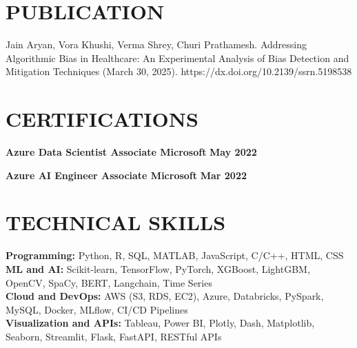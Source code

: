 \documentclass[10pt]{article}
\begin{document}
\vspace{-0.4cm} 
\section*{PUBLICATION} 
\vspace{-0.2cm}

\noindent
\noindent Jain Aryan, Vora Khushi, Verma Shrey, Churi Prathamesh. Addressing Algorithmic Bias in Healthcare: An Experimental Analysis of Bias Detection and Mitigation Techniques (March 30, 2025). https://dx.doi.org/10.2139/ssrn.5198538


\vspace{-0.4cm} 
\section*{CERTIFICATIONS} 
\vspace{-0.2cm}

\noindent
\textbf{Azure Data Scientist Associate \textbar{} Microsoft } \hfill \textbf{May 2022 }

\noindent
\textbf{Azure AI Engineer Associate \textbar{} Microsoft } \hfill \textbf{Mar 2022 }


\vspace{-0.4cm} 
\section*{TECHNICAL SKILLS} 
\vspace{-0.2cm}
\noindent
\textbf{Programming:} Python, R, SQL, MATLAB, JavaScript, C/C++, HTML, CSS \\
\textbf{ML and AI:} Scikit-learn, TensorFlow, PyTorch, XGBoost, LightGBM, OpenCV, SpaCy, BERT, Langchain, Time Series \\
\textbf{Cloud and DevOps:} AWS (S3, RDS, EC2), Azure, Databricks, PySpark, MySQL, Docker, MLflow, CI/CD Pipelines \\
\textbf{Visualization and APIs:} Tableau, Power BI, Plotly, Dash, Matplotlib, Seaborn, Streamlit, Flask, FastAPI, RESTful APIs
\end{document}
